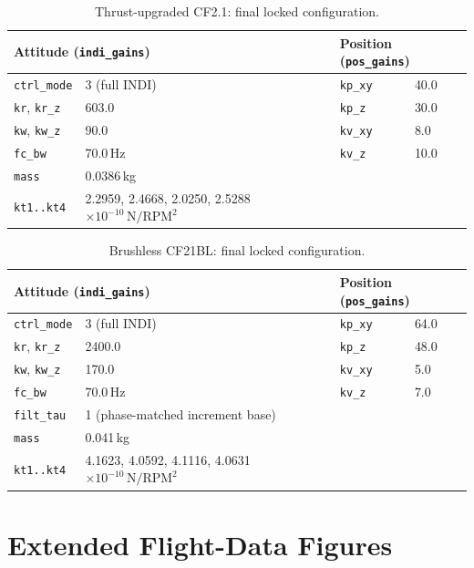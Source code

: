 \documentclass[11pt,a4paper]{article}
\newcommand{\code}[1]{\texttt{#1}}
\begin{document}
\begin{table}[H]
\centering
\begin{tabular}{@{}llll@{}}
\toprule
\multicolumn{2}{l}{\textbf{Attitude (\code{indi\_gains})}} & \multicolumn{2}{l}{\textbf{Position (\code{pos\_gains})}} \\
\midrule
\code{ctrl\_mode} & 3 (full INDI) & \code{kp\_xy} & 40.0 \\
\code{kr}, \code{kr\_z} & 603.0 & \code{kp\_z} & 30.0 \\
\code{kw}, \code{kw\_z} & 90.0 & \code{kv\_xy} & 8.0 \\
\code{fc\_bw} & 70.0\,Hz & \code{kv\_z} & 10.0 \\
\code{mass} & 0.0386\,kg & & \\
\code{kt1..kt4} & 2.2959, 2.4668, 2.0250, 2.5288 $\times10^{-10}\,\mathrm{N/RPM^2}$ & & \\
\bottomrule
\end{tabular}
\caption{Thrust-upgraded CF2.1: final locked configuration.}
\label{tab:upgraded-config}
\end{table}

\begin{table}[H]
\centering
\begin{tabular}{@{}llll@{}}
\toprule
\multicolumn{2}{l}{\textbf{Attitude (\code{indi\_gains})}} & \multicolumn{2}{l}{\textbf{Position (\code{pos\_gains})}} \\
\midrule
\code{ctrl\_mode} & 3 (full INDI) & \code{kp\_xy} & 64.0 \\
\code{kr}, \code{kr\_z} & 2400.0 & \code{kp\_z} & 48.0 \\
\code{kw}, \code{kw\_z} & 170.0 & \code{kv\_xy} & 5.0 \\
\code{fc\_bw} & 70.0\,Hz & \code{kv\_z} & 7.0 \\
\code{filt\_tau} & 1 (phase-matched increment base) & & \\
\code{mass} & 0.041\,kg & & \\
\code{kt1..kt4} & 4.1623, 4.0592, 4.1116, 4.0631 $\times10^{-10}\,\mathrm{N/RPM^2}$ & & \\
\bottomrule
\end{tabular}
\caption{Brushless CF21BL: final locked configuration.}
\label{tab:brushless-config}
\end{table}

\clearpage
\section{Extended Flight-Data Figures}
\label{sec:appendix-figures}
\end{document}
